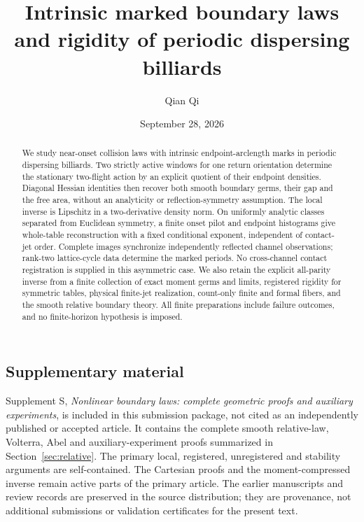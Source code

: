 \documentclass[11pt]{amsart}
\title[Intrinsic marked boundary laws]{Intrinsic marked boundary laws and rigidity of periodic dispersing billiards}
\author{Qian Qi}
\date{September 28, 2026}
\theoremstyle{definition}\newtheorem{definition}[theorem]{Definition}
\theoremstyle{remark}\newtheorem{remark}[theorem]{Remark}
\numberwithin{equation}{section}
\begin{document}
\begin{abstract}
We study near-onset collision laws with intrinsic endpoint-arclength
marks in periodic dispersing billiards. Two strictly active windows for
one return orientation determine the stationary two-flight action by an
explicit quotient of their endpoint densities. Diagonal Hessian identities
then recover both smooth boundary germs, their gap and the free area,
without an analyticity or reflection-symmetry assumption. The local
inverse is Lipschitz in a two-derivative density norm. On uniformly
analytic classes separated from Euclidean symmetry, a finite onset pilot
and endpoint histograms give whole-table reconstruction with a fixed
conditional exponent, independent of contact-jet order. Complete images
synchronize independently reflected channel observations; rank-two
lattice-cycle data determine the marked periods. No cross-channel
contact registration is supplied in this asymmetric case. We also retain
the explicit all-parity inverse from a finite collection of exact moment
germs and limits, registered rigidity for symmetric tables, physical
finite-jet realization, count-only finite and formal fibers, and the
smooth relative boundary theory. All finite preparations include failure
outcomes, and no finite-horizon hypothesis is imposed.
\end{abstract}
\maketitle














\subsection*{Supplementary material}
Supplement S, \emph{Nonlinear boundary laws: complete geometric proofs
and auxiliary experiments}, is included in this submission package, not
cited as an independently published or accepted article. It contains the
complete smooth relative-law, Volterra, Abel and auxiliary-experiment
proofs summarized in Section~\ref{sec:relative}. The primary local,
registered, unregistered and stability arguments are self-contained.
The Cartesian proofs and the moment-compressed inverse remain active
parts of the primary article. The earlier manuscripts and review records
are preserved in the source distribution; they are provenance, not
additional submissions or validation certificates for the present text.
\end{document}
